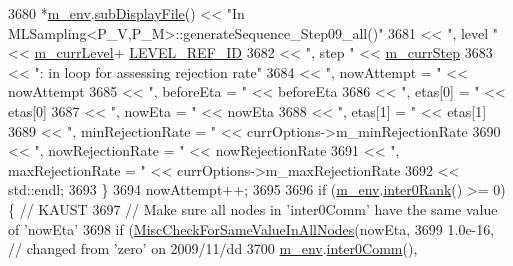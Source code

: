 \begin{DoxyCode}
3680           *\hyperlink{class_q_u_e_s_o_1_1_m_l_sampling_a13f1ca4fe9f94822fe572a743eaced1d}{m\_env}.\hyperlink{class_q_u_e_s_o_1_1_base_environment_a8a0064746ae8dddfece4229b9ad374d6}{subDisplayFile}() << \textcolor{stringliteral}{"In
       MLSampling<P\_V,P\_M>::generateSequence\_Step09\_all()"}
3681                                   << \textcolor{stringliteral}{", level "}              << \hyperlink{class_q_u_e_s_o_1_1_m_l_sampling_af9416874c856e50f3b35270e801f17e4}{m\_currLevel}+
      \hyperlink{_m_l_sampling_level_options_8h_a68d15eaf394d210effcf584b938206d3}{LEVEL\_REF\_ID}
3682                                   << \textcolor{stringliteral}{", step "}               << \hyperlink{class_q_u_e_s_o_1_1_m_l_sampling_a1b1f8ccb4823bdfa26ec652f0807c63e}{m\_currStep}
3683                                   << \textcolor{stringliteral}{": in loop for assessing rejection rate"}
3684                                   << \textcolor{stringliteral}{", nowAttempt = "}       << nowAttempt
3685                                   << \textcolor{stringliteral}{", beforeEta = "}        << beforeEta
3686                                   << \textcolor{stringliteral}{", etas[0] = "}          << etas[0]
3687                                   << \textcolor{stringliteral}{", nowEta = "}           << nowEta
3688                                   << \textcolor{stringliteral}{", etas[1] = "}          << etas[1]
3689                                   << \textcolor{stringliteral}{", minRejectionRate = "} << currOptions->m\_minRejectionRate
3690                                   << \textcolor{stringliteral}{", nowRejectionRate = "} << nowRejectionRate
3691                                   << \textcolor{stringliteral}{", maxRejectionRate = "} << currOptions->m\_maxRejectionRate
3692                                   << std::endl;
3693         \}
3694         nowAttempt++;
3695 
3696         \textcolor{keywordflow}{if} (\hyperlink{class_q_u_e_s_o_1_1_m_l_sampling_a13f1ca4fe9f94822fe572a743eaced1d}{m\_env}.\hyperlink{class_q_u_e_s_o_1_1_base_environment_ae106b5bb8a80b655b88b3a26b1e7c185}{inter0Rank}() >= 0) \{ \textcolor{comment}{// KAUST}
3697           \textcolor{comment}{// Make sure all nodes in 'inter0Comm' have the same value of 'nowEta'}
3698           \textcolor{keywordflow}{if} (\hyperlink{namespace_q_u_e_s_o_a4166a375c5adbea35afaaf20775bc519}{MiscCheckForSameValueInAllNodes}(nowEta,
3699                                                 1.0e-16, \textcolor{comment}{// changed from 'zero' on 2009/11/dd}
3700                                                 \hyperlink{class_q_u_e_s_o_1_1_m_l_sampling_a13f1ca4fe9f94822fe572a743eaced1d}{m\_env}.\hyperlink{class_q_u_e_s_o_1_1_base_environment_a689e4d140c74d495d97eb498714a4b82}{inter0Comm}(),

\end{DoxyCode}
